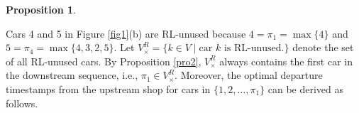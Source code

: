 \documentclass[12pt]{article}
\newtheorem{proposition}[theorem]{Proposition}
\newtheorem{definition}{Definition}
\begin{document}
\begin{proposition}
\end{proposition}

\noindent Cars 4 and 5 in Figure \ref{fig1}(b) are RL-unused because $4=\pi_1=\max \{4\}$ and $5=\pi_4=\max\{4,3,2,5\}$. Let $V^{R}_{\times}=\{k\in V \mid \text{car } k \text{ is RL-unused.}\}$ denote the set of all RL-unused cars. By Proposition \ref{pro2}, $V^{R}_{\times}$ always contains the first car in the downstream sequence, i.e., $\pi_1\in V^{R}_{\times}$. %
Moreover, the optimal departure timestamps from the upstream shop for cars in $\{1,2,\dots,\pi_1\}$ can be derived as follows.




\end{document}
